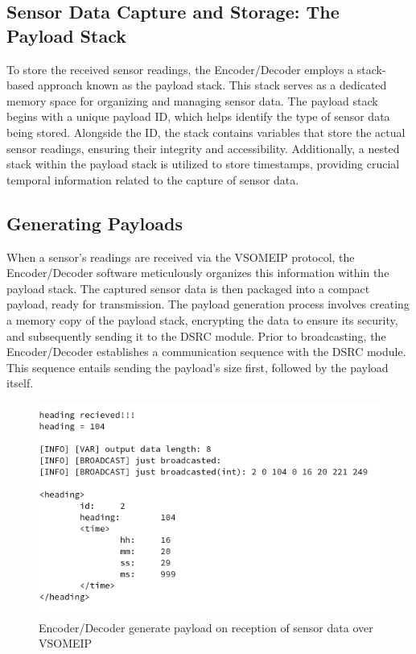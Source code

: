 \documentclass[
12pt,
oneside, 
onehalfspacing, 
nolistspacing, 
parskip, 
chapterinoneline, 
]{AASTCOMPUTER}
\begin{document}
\subsection{Sensor Data Capture and Storage: The Payload Stack}
To store the received sensor readings, the Encoder/Decoder employs a stack-based approach known as the payload stack. This stack serves as a dedicated memory space for organizing and managing sensor data. The payload stack begins with a unique payload ID, which helps identify the type of sensor data being stored. Alongside the ID, the stack contains variables that store the actual sensor readings, ensuring their integrity and accessibility. Additionally, a nested stack within the payload stack is utilized to store timestamps, providing crucial temporal information related to the capture of sensor data.

\subsection{Generating Payloads}
When a sensor's readings are received via the VSOMEIP protocol, the Encoder/Decoder software meticulously organizes this information within the payload stack. The captured sensor data is then packaged into a compact payload, ready for transmission. The payload generation process involves creating a memory copy of the payload stack, encrypting the data to ensure its security, and subsequently sending it to the DSRC module. Prior to broadcasting, the Encoder/Decoder establishes a communication sequence with the DSRC module. This sequence entails sending the payload's size first, followed by the payload itself.

\begin{figure}[!ht]
\centering
\includegraphics[scale=0.5]{Figures/31.png}
\caption[DSRC generate payload]{Encoder/Decoder generate payload on reception of sensor data over VSOMEIP}
\label{fig:EncoderDecoder generate payload on reception of sensor data over VSOMEIP}
\end{figure}
\end{document}
